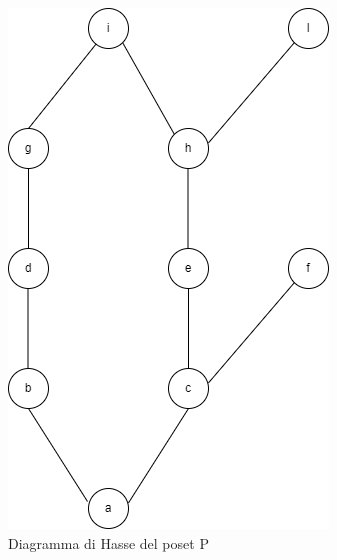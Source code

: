 \documentclass[12pt]{article}
\begin{document}
\begin{figure}[H]
    \centering
    \includegraphics[scale=.5]{hasse2.png}
    \caption{Diagramma di Hasse del poset P}
\end{figure} 
\end{document}
